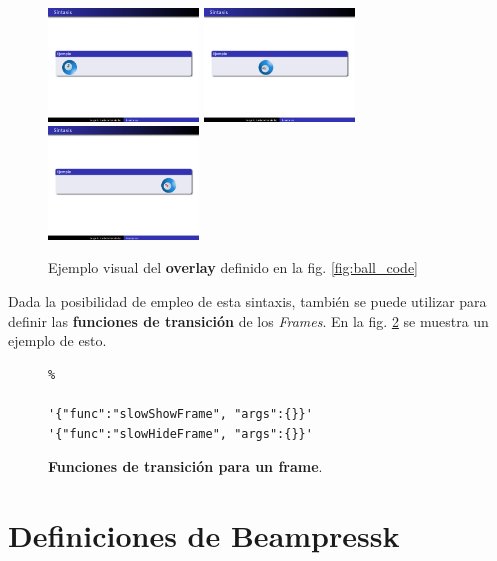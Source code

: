  		\begin{figure}[tb]
 			\centering
 			\includegraphics[width=4cm]{img/ball-left}
 			\includegraphics[width=4cm]{img/ball-middle}
 			\includegraphics[width=4cm]{img/ball-right}
 			\caption{Ejemplo visual del \textbf{overlay} definido en la fig. \ref{fig:ball_code}}
 			\label{fig:ball_visual} 
 		\end{figure}	


	Dada la posibilidad de empleo de esta sintaxis, también se puede utilizar para definir las \textbf{funciones de transición} de los \textit{Frames}. En la fig. \ref{fig:frame_trans} se muestra un ejemplo de esto.

		\begin{figure}[htb]%
			\begin{lstlisting}%

'{"func":"slowShowFrame", "args":{}}'
'{"func":"slowHideFrame", "args":{}}'
			\end{lstlisting}
		\caption{
			\textbf{Funciones de transición para un frame}. 
			\label{fig:frame_trans} }
		\end{figure}	


	\section{Definiciones de Beampressk} %
	\label{sec:definiciones_de_beampressk}
	

